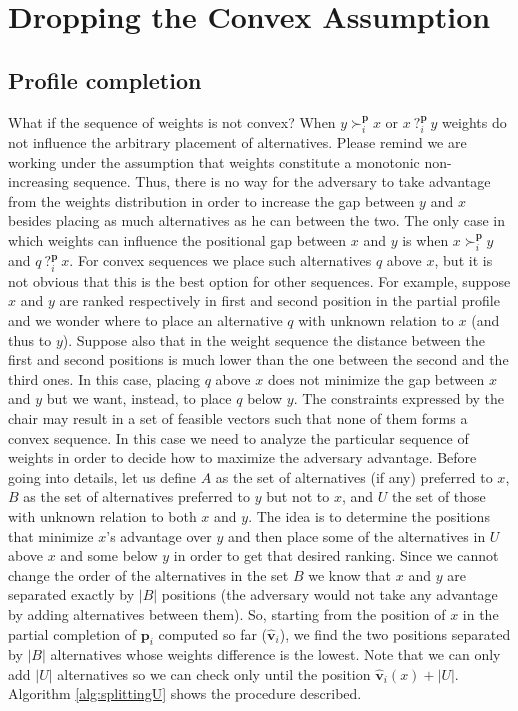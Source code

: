 \documentclass[12pt]{article}
\newcommand{\profile}{\textbf{v}}%
\newcommand{\pprofile}{\textbf{p}}%
\begin{document}
\section{Dropping the Convex Assumption}
\subsection{Profile completion}
What if the sequence of weights is not convex? When $y \succ_i^\pprofile x$ or $x \ ?_i^\pprofile \ y$ weights do not influence the arbitrary placement of alternatives. Please remind we are working under the assumption that weights constitute a monotonic non-increasing sequence. Thus, there is no way for the adversary to take advantage from the weights distribution in order to increase the gap between $y$ and $x$ besides placing as much alternatives as he can between the two. The only case in which weights can influence the positional gap between $x$ and $y$ is when $x \succ_i^\pprofile y$ and $q \ ?_i^\pprofile \ x$. For convex sequences we place such alternatives $q$ above $x$, but it is not obvious that this is the best option for other sequences. For example, suppose $x$ and $y$ are ranked respectively in first and second position in the partial profile and we wonder where to place an alternative $q$ with unknown relation to $x$ (and thus to $y$). Suppose also that in the weight sequence the distance between the first and second positions is much lower than the one between the second and the third ones. In this case, placing $q$ above $x$ does not minimize the gap between $x$ and $y$ but we want, instead, to place $q$ below $y$.
\newline The constraints expressed by the chair may result in a set of feasible vectors such that none of them forms a convex sequence. In this case we need to analyze the particular sequence of weights in order to decide how to maximize the adversary advantage. Before going into details, let us define $A$ as the set of alternatives (if any) preferred to $x$, $B$ as the set of alternatives preferred to $y$ but not to $x$, and $U$ the set of those with unknown relation to both $x$ and $y$. The idea is to determine the positions that minimize $x$'s advantage over $y$ and then place some of the alternatives in $U$ above $x$ and some below $y$ in order to get that desired ranking. Since we cannot change the order of the alternatives in the set $B$ we know that $x$ and $y$ are separated exactly by $|B|$ positions (the adversary would not take any advantage by adding alternatives between them). So, starting from the position of $x$ in the partial completion of $\pprofile_i$ computed so far ($\hat{\profile}_i$), we find the two positions separated by $|B|$ alternatives whose weights difference is the lowest. Note that we can only add $|U|$ alternatives so we can check only until the position $\hat{\profile}_i(x)+|U|$. Algorithm \ref{alg:splittingU} shows the procedure described.
\end{document}
